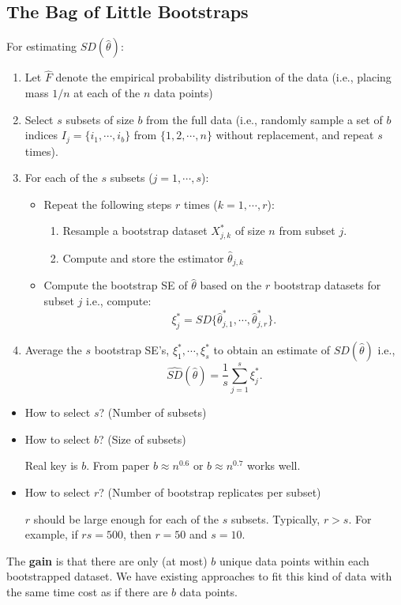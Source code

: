 \documentclass[11pt]{article}
\begin{document}
\subsection{The Bag of Little Bootstraps}
For estimating $SD(\hat{\theta})$:
\begin{enumerate}
  \item Let $\hat{F}$ denote the empirical probability distribution of the data
(i.e., placing mass $1/n$ at each of the $n$ data points)
  \item Select $s$ subsets of size $b$ from the full data (i.e., randomly sample a set of $b$ indices $I_j=\{i_1,\cdots,i_b\}$ from $\{1,2,\cdots,n\}$ without replacement, and repeat $s$ times).
  \item For each of the $s$ subsets ($j=1,\cdots,s$):
    \begin{itemize}
      \item Repeat the following steps $r$ times ($k=1,\cdots,r$):
        \begin{enumerate}
          \item Resample a bootstrap dataset $X_{j,k}^*$ of size $n$ from subset $j$.
          \item Compute and store the estimator $\hat{\theta}_{j,k}$
        \end{enumerate}
      \item Compute the bootstrap SE of $\hat{\theta}$ based on the $r$ bootstrap datasets for subset $j$ i.e., compute:
          $$\xi_j^*=SD\{\hat{\theta}_{j,1}^*,\cdots,\hat{\theta}_{j,r}^*\}.$$
    \end{itemize}
  \item Average the $s$ bootstrap SE's, $\xi_1^*,\cdots,\xi_s^*$ to obtain an estimate of $SD(\hat{\theta})$ i.e.,
      $$\widehat{SD}(\hat{\theta})=\frac{1}{s}\sum \limits_{j=1}^s \xi_j^*.$$
\end{enumerate}
\begin{itemize}
  \item How to select $s$? (Number of subsets)
  \item How to select $b$? (Size of subsets)

  Real key is $b$. From paper $b\approx n^{0.6}$ or $b\approx n^{0.7}$ works well.
  \item How to select $r$? (Number of bootstrap replicates per subset)

  $r$ should be large enough for each of the $s$ subsets. Typically, $r>s$. For example, if $rs=500$, then $r=50$ and $s=10$.
\end{itemize}
The \textbf{gain} is that there are only (at most) $b$ unique data points within each bootstrapped dataset. We have existing approaches to fit this kind of data with the same time cost as if there are $b$ data points.
\end{document}
